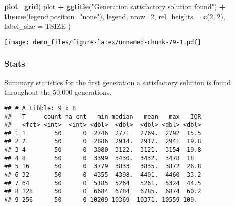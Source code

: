 \documentclass[]{book}
\newenvironment{Shaded}{\begin{snugshade}}{\end{snugshade}}
\newcommand{\DataTypeTok}[1]{\textcolor[rgb]{0.13,0.29,0.53}{#1}}
\newcommand{\DecValTok}[1]{\textcolor[rgb]{0.00,0.00,0.81}{#1}}
\newcommand{\KeywordTok}[1]{\textcolor[rgb]{0.13,0.29,0.53}{\textbf{#1}}}
\newcommand{\NormalTok}[1]{#1}
\newcommand{\OperatorTok}[1]{\textcolor[rgb]{0.81,0.36,0.00}{\textbf{#1}}}
\newcommand{\OtherTok}[1]{\textcolor[rgb]{0.56,0.35,0.01}{#1}}
\newcommand{\StringTok}[1]{\textcolor[rgb]{0.31,0.60,0.02}{#1}}
\begin{document}
\begin{Shaded}
\begin{Highlighting}[]
\KeywordTok{plot_grid}\NormalTok{(}
\NormalTok{  plot }\OperatorTok{+}
\StringTok{    }\KeywordTok{ggtitle}\NormalTok{(}\StringTok{"Generation satisfactory solution found"}\NormalTok{) }\OperatorTok{+}
\StringTok{    }\KeywordTok{theme}\NormalTok{(}\DataTypeTok{legend.position=}\StringTok{"none"}\NormalTok{),}
\NormalTok{  legend,}
  \DataTypeTok{nrow=}\DecValTok{2}\NormalTok{,}
  \DataTypeTok{rel_heights =} \KeywordTok{c}\NormalTok{(}\DecValTok{2}\NormalTok{,.}\DecValTok{2}\NormalTok{),}
  \DataTypeTok{label_size =}\NormalTok{ TSIZE}
\NormalTok{)}
\end{Highlighting}
\end{Shaded}

\texttt{[image: demo\_files/figure-latex/unnamed-chunk-79-1.pdf]}

\hypertarget{stats-13}{%
\subsubsection{Stats}\label{stats-13}}

Summary statistics for the first generation a satisfactory solution is found throughout the 50,000 generations.

\begin{Shaded}
\end{Shaded}

\begin{verbatim}
## # A tibble: 9 x 8
##   T     count na_cnt   min median   mean   max   IQR
##   <fct> <int>  <int> <dbl>  <dbl>  <dbl> <dbl> <dbl>
## 1 1        50      0  2746  2771   2769.  2792  15.5
## 2 2        50      0  2886  2914.  2917.  2941  19.8
## 3 4        50      0  3080  3122.  3121.  3154  19.8
## 4 8        50      0  3399  3430.  3432.  3478  18  
## 5 16       50      0  3779  3833   3835.  3872  26.8
## 6 32       50      0  4355  4398.  4401.  4460  33.2
## 7 64       50      0  5185  5264   5261.  5324  44.5
## 8 128      50      0  6684  6784   6785.  6874  60.2
## 9 256      50      0 10209 10369  10371. 10559 109.
\end{verbatim}
\end{document}
